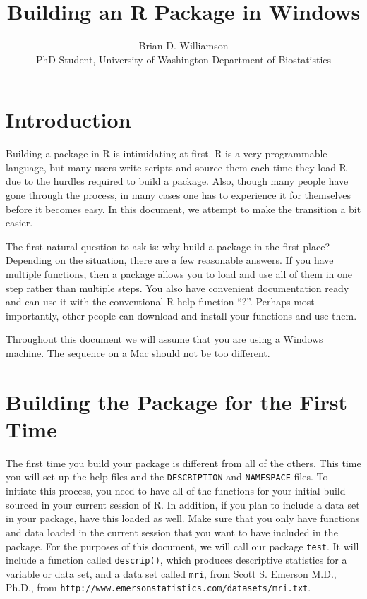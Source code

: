 \documentclass{article}
\title{Building an R Package in Windows}
\author{Brian D. Williamson\\PhD Student, University of Washington Department of Biostatistics}
\begin{document}
\maketitle
\tableofcontents
\section{Introduction}
Building a package in R is intimidating at first. R is a very programmable language, but many users write scripts and source them each time they load R due to the hurdles required to build a package. Also, though many people have gone through the process, in many cases one has to experience it for themselves before it becomes easy. In this document, we attempt to make the transition a bit easier.

The first natural question to ask is: why build a package in the first place? Depending on the situation, there are a few reasonable answers. If you have multiple functions, then a package allows you to load and use all of them in one step rather than multiple steps. You also have convenient documentation ready and can use it with the conventional R help function ``?''. Perhaps most importantly, other people can download and install your functions and use them.

Throughout this document we will assume that you are using a Windows machine. The sequence on a Mac should not be too different.

\section{Building the Package for the First Time}
The first time you build your package is different from all of the others. This time you will set up the help files and the \texttt{DESCRIPTION} and \texttt{NAMESPACE} files. To initiate this process, you need to have all of the functions for your initial build sourced in your current session of R. In addition, if you plan to include a data set in your package, have this loaded as well. Make sure that you only have functions and data loaded in the current session that you want to have included in the package. For the purposes of this document, we will call our package \texttt{test}. It will include a function called \texttt{descrip()}, which produces descriptive statistics for a variable or data set, and a data set called \texttt{mri}, from Scott S. Emerson M.D., Ph.D., from \texttt{http://www.emersonstatistics.com/datasets/mri.txt}.
\end{document}

